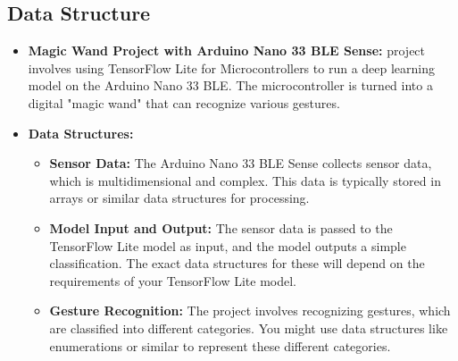 \subsection{Data Structure}

\begin{itemize}
    \item \textbf{Magic Wand Project with Arduino Nano 33 BLE Sense:}  project involves using TensorFlow Lite for Microcontrollers to run a deep learning model on the Arduino Nano 33 BLE. The microcontroller is turned into a digital "magic wand" that can recognize various gestures.\cite{Harris:2023}
    
    \item \textbf{Data Structures:}
    \begin{itemize}
        \item \textbf{Sensor Data:} The Arduino Nano 33 BLE Sense collects sensor data, which is multidimensional and complex. This data is typically stored in arrays or similar data structures for processing.
        \item \textbf{Model Input and Output:} The sensor data is passed to the TensorFlow Lite model as input, and the model outputs a simple classification. The exact data structures for these will depend on the requirements of your TensorFlow Lite model.
        \item \textbf{Gesture Recognition:} The project involves recognizing gestures, which are classified into different categories. You might use data structures like enumerations or similar to represent these different categories.
    \end{itemize}
\end{itemize}




